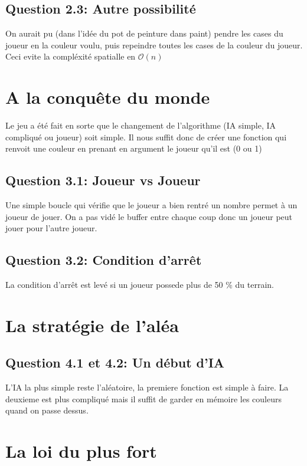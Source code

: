 \documentclass[11pt]{article}
\begin{document}
    \subsection{Question 2.3: Autre possibilité}
    On aurait pu (dans l'idée du pot de peinture dans paint) pendre les cases du joueur en la couleur voulu, puis repeindre toutes les cases de la couleur du joueur. Ceci evite la compléxité spatialle en $\mathcal{O}(n)$

    \section{A la conquête du monde}

    Le jeu a été fait en sorte que le changement de l'algorithme (IA simple, IA compliqué ou joueur) soit simple. Il nous suffit donc de créer une fonction qui renvoit une couleur en prenant en argument le joueur qu'il est (0 ou 1)

    \subsection{Question 3.1: Joueur vs Joueur}

    Une simple boucle qui vérifie que le joueur a bien rentré un nombre permet à un joueur de jouer. On a pas vidé le buffer entre chaque coup donc un joueur peut jouer pour l'autre joueur.

    \subsection{Question 3.2: Condition d'arrêt}

    La condition d'arrêt est levé si un joueur possede plus de 50 \% du terrain.

    \section{La stratégie de l'aléa}

    \subsection{Question 4.1 et 4.2: Un début d'IA}

    L'IA la plus simple reste l'aléatoire, la premiere fonction est simple à faire. La deuxieme est plus compliqué mais il suffit de garder en mémoire les couleurs quand on passe dessus.

    \section{La loi du plus fort}
\end{document}
